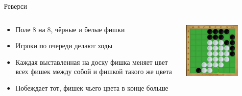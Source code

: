 \documentclass{../../slides-style}
\begin{document}
    \begin{frame}[plain]
        \titlepage
    \end{frame}

    \begin{frame}{Реверси}
        \begin{columns}
            \begin{column}{0.7\textwidth}
                \begin{itemize}
                    \item Поле 8 на 8, чёрные и белые фишки
                    \item Игроки по очереди делают ходы
                    \item Каждая выставленная на доску фишка меняет цвет всех фишек между собой и фишкой такого же цвета
                    \item Побеждает тот, фишек чьего цвета в конце больше
                \end{itemize}
            \end{column}
            \begin{column}{0.3\textwidth}
                \begin{center}
                    \includegraphics[width=0.8\textwidth]{reversi.png}

                    \vspace{1cm}


\end{center}
\end{column}
\end{columns}
\end{frame}
\end{document}
